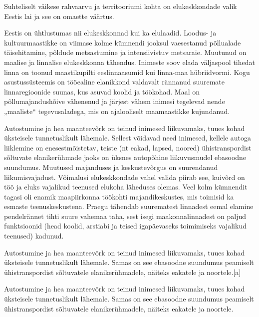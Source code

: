 \documentclass[estonian,]{article}
\begin{document}
\begin{blockquote-right}
Suhteliselt väikese rahvaarvu ja territooriumi kohta on elukeskkondade
valik Eestis lai ja see on omaette väärtus.
\end{blockquote-right}

Eestis on ühtlustumas nii elukeskkonnad kui ka elulaadid. Loodus- ja kultuurmaastikke on viimase kolme kümnendi jooksul vaesestanud põllualade täisehitamine, põldude metsastumine ja intensiivistuv metsaraie. Muutunud on maalise ja linnalise elukeskkonna tähendus. Inimeste soov elada väljaspool tihedat linna on toonud maastikupilti eeslinnaasumid kui linna-maa hübriidvormi. Kogu asustussüsteemis on tööealine elanikkond valdavalt rännanud suuremate linnaregioonide suunas, kus asuvad koolid ja töökohad. Maal on põllumajandushõive vähenenud ja järjest vähem inimesi tegelevad nende „maaliste`` tegevusaladega, mis on ajalooliselt maamaastikke kujundanud.

Autostumine ja hea maanteevõrk on teinud inimesed liikuvamaks, tuues kohad üksteisele tunnetuslikult lähemale. Sellest võidavad need inimesed, kellele autoga liiklemine on enesestmõistetav, teiste (nt eakad, lapsed, noored) ühistranspordist sõltuvate elanikerühmade jaoks on üksnes autopõhine liikuvusmudel ebasoodne suundumus. Muutused majanduses ja keskustevõrgus on suurendanud liikumisvajadust. Võimalusi elukeskkondade vahel valida piirab see, kuivõrd on töö ja eluks vajalikud teenused elukoha läheduses olemas. Veel kolm kümnendit tagasi oli enamik maapiirkonna töökohti majandikeskustes, mis toimisid ka esmaste teenuskeskustena. Praegu tähendab suurematest linnadest eemal elamine pendelrännet tihti suure vahemaa taha, sest isegi maakonnalinnadest on paljud funktsioonid (head koolid, arstiabi ja teised igapäevaseks toimimiseks vajalikud teenused) kadunud.

Autostumine ja hea maanteevõrk on teinud inimesed liikuvamaks, tuues kohad üksteisele tunnetuslikult lähemale. Samas on see ebasoodne suundumus peamiselt ühistranspordist sõltuvatele elanikerühmadele, näiteks eakatele ja noortele.{[}a{]}

\begin{blockquote-left}
Autostumine ja hea maanteevõrk on teinud inimesed liikuvamaks, tuues
kohad üksteisele tunnetuslikult lähemale. Samas on see ebasoodne
suundumus peamiselt ühistranspordist sõltuvatele elanikerühmadele,
näiteks eakatele ja noortele.
\end{blockquote-left}
\end{document}
